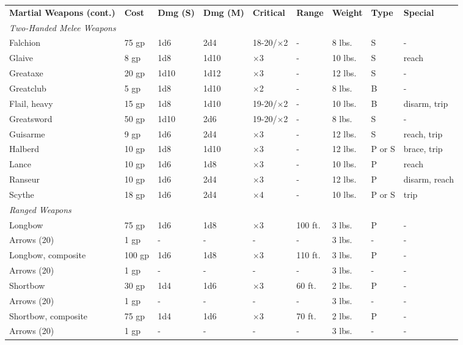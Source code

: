  \begin{table*}
  \sffamily
  \begin{tabular}{lllllllll}
\textbf{Martial Weapons (cont.)} & \textbf{Cost} & \textbf{Dmg (S)} & \textbf{Dmg (M)} & \textbf{Critical} & \textbf{Range} & \textbf{Weight} & \textbf{Type} & \textbf{Special}\\
 \textit{Two-Handed Melee Weapons} \\
 Falchion & 75 gp & 1d6 & 2d4 & 18-20/$\times$2 & - & 8 lbs. & S & - \\
 Glaive & 8 gp & 1d8 & 1d10 & $\times$3 & - & 10 lbs. & S & reach \\
 Greataxe & 20 gp & 1d10 & 1d12 & $\times$3 & - & 12 lbs. & S & - \\
 Greatclub & 5 gp & 1d8 & 1d10 & $\times$2 & - & 8 lbs. & B & - \\
 Flail, heavy & 15 gp & 1d8 & 1d10 & 19-20/$\times$2 & - & 10 lbs. & B & disarm, trip \\
 Greatsword & 50 gp & 1d10 & 2d6 & 19-20/$\times$2 & - & 8 lbs. & S & - \\
 Guisarme & 9 gp & 1d6  & 2d4 & $\times$3 & - & 12 lbs. & S & reach, trip \\
 Halberd & 10 gp & 1d8 & 1d10 & $\times$3 & - & 12 lbs. & P or S & brace, trip \\
 Lance & 10 gp & 1d6 & 1d8 & $\times$3 & - & 10 lbs. & P & reach \\
 Ranseur & 10 gp & 1d6 & 2d4 & $\times$3 & - & 12 lbs. & P & disarm, reach \\
 Scythe & 18 gp & 1d6 & 2d4 & $\times$4 & - & 10 lbs. & P or S & trip \\
 \textit{Ranged Weapons} \\
 Longbow & 75 gp & 1d6 & 1d8 & $\times$3 & 100 ft. & 3 lbs. & P & - \\
 Arrows (20) & 1 gp & - & - & - & - & 3 lbs. & - & - \\
 Longbow, composite & 100 gp & 1d6 & 1d8 & $\times$3 & 110 ft. & 3 lbs. & P & - \\
 Arrows (20) & 1 gp & - & - & - & - & 3 lbs. & - & - \\
 Shortbow & 30 gp & 1d4 & 1d6 & $\times$3 & 60 ft. & 2 lbs. & P & - \\
 Arrows (20) & 1 gp & - & - & - & - & 3 lbs. & - & - \\
 Shortbow, composite & 75 gp & 1d4 & 1d6 & $\times$3 & 70 ft. & 2 lbs. & P & - \\
 Arrows (20) & 1 gp & - & - & - & - & 3 lbs. & - & -\\

\end{tabular}
\end{table*}

